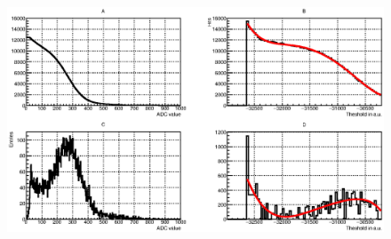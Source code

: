 \begin{figure}
\includegraphics[width=1.0\textwidth]{pictures/Blackboard_18jan.eps}
\caption{}
\label{fig:Blackboard}
\end{figure}
